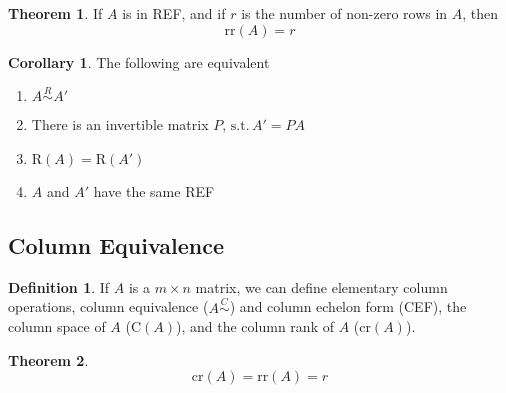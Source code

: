 \documentclass[fleqn, a4paper, 12pt]{article}
\theoremstyle{definition}
\newtheorem{definition}{Definition} %
\theoremstyle{theorem}
\newtheorem{theorem}{Theorem} %
\newtheorem{corollary}{Corollary}
\theoremstyle{remark}
\newcommand{\suchthat}{\mathrm{\,s.t.\,}}
\newcommand{\R}{\mathrm{R}}
\newcommand{\C}{\mathrm{C}}
\newcommand{\rr}{\mathrm{rr}}
\numberwithin{equation}{theorem}
\begin{document}
\begin{theorem}
	If $A$ is in REF, and if $r$ is the number of non-zero rows in $A$, then
	\begin{equation*}
	\rr(A) = r
	\end{equation*}
\end{theorem}

\begin{corollary}
	The following are equivalent
	\begin{enumerate}
		\item $A \stackrel{R}{\sim} A'$
		\item There is an invertible matrix $P, \suchthat A' = P A$
		\item $\R(A) = \R(A')$
		\item $A$ and $A'$ have the same REF
	\end{enumerate}
\end{corollary}

\subsection{Column Equivalence}

\begin{definition}
	If $A$ is a $m \times n$ matrix, we can define elementary column operations, column equivalence ($A \stackrel{C}{\sim}$) and column echelon form (CEF), the column space of $A$ ($\C(A)$), and the column rank of $A$ ($\mathrm{cr}(A)$).
\end{definition}

\begin{theorem}
	\begin{equation*}
	\mathrm{cr}(A) = \rr(A) =  r
	\end{equation*}
\end{theorem}
\end{document}
